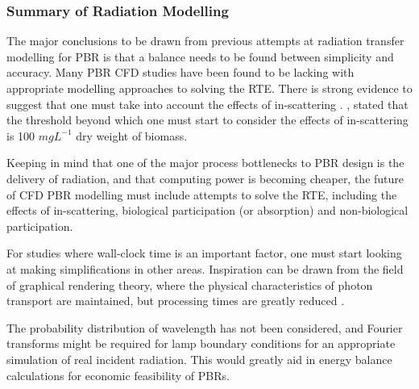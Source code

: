 

\subsubsection{Summary of Radiation Modelling}
The major conclusions to be drawn from previous attempts at radiation transfer modelling for PBR is that a balance needs to be found between simplicity and accuracy. Many PBR CFD studies have been found to be lacking with appropriate modelling approaches to solving the RTE. There is strong evidence to suggest that one must take into account the effects of in-scattering \cite{heinrich2012,kong2014,modest2003,krishnamoorthy2014,lee2014,gao2016}. \cite{heinrich2012}, stated that the threshold beyond which one must start to consider the effects of in-scattering is 100 $mg L^{-1}$ dry weight of biomass. 
\skippingparagraph

Keeping in mind that one of the major process bottlenecks to PBR design is the delivery of radiation, and that computing power is becoming cheaper, the future of CFD PBR modelling must include attempts to solve the RTE, including the effects of in-scattering, biological participation (or absorption) and non-biological participation. 
\skippingparagraph

For studies where wall-clock time is an important factor, one must start looking at making simplifications in other areas. Inspiration can be drawn from the field of graphical rendering theory, where the physical characteristics of photon transport are maintained, but processing times are greatly reduced \cite{jarosz2008}.
\skippingparagraph

The probability distribution of wavelength has not been considered, and Fourier transforms might be required for lamp boundary conditions for an appropriate simulation of real incident radiation. This would greatly aid in energy balance calculations for economic feasibility of PBRs. 

